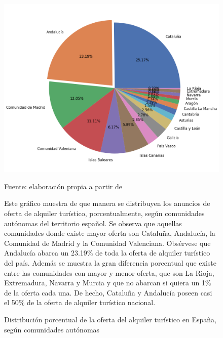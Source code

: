 \documentclass[a4paper,10pt]{article}
\begin{document}
            \begin{figure}[h]
                \begin{center}
                    \includegraphics*[width = 13cm]{graphics/spainccaadensity.png}
                    \begin{flushright}
                        \footnotesize{Fuente: elaboración propia a partir de \cite[(1)]{datahippo}}
                    \end{flushright}
                    \caption{Distribución porcentual de la oferta del alquiler turístico en España, según comunidades autónomas}
                    \label{spainccaadensity}
                \end{center}
            
                Este gráfico muestra de que manera se distribuyen los anuncios de oferta de alquiler turístico, porcentualmente,
                según comunidades autónomas del territorio español. Se observa que aquellas comunidades donde existe mayor oferta son
                Cataluña, Andalucía, la Comunidad de Madrid y la Comunidad Valenciana. Obsérvese que Andalucía abarca un 23.19\% de toda la 
                oferta de alquiler turístico del país. Además se muestra la gran diferencia porcentual que existe entre las comunidades 
                con mayor y menor oferta, que son La Rioja, Extremadura, Navarra y Murcia y que no abarcan si quiera un 1\% de la oferta cada una.
                De hecho, Cataluña y Andalucía poseen casi el 50\% de la oferta de alquiler turístico nacional.

            \end{figure}
\end{document}

